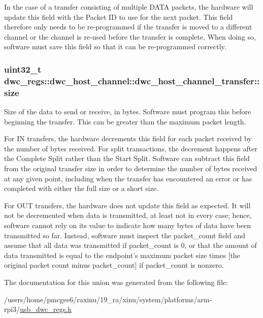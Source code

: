 In the case of a transfer consisting of multiple D\-A\-T\-A packets, the hardware will update this field with the Packet I\-D to use for the next packet. This field therefore only needs to be re-\/programmed if the transfer is moved to a different channel or the channel is re-\/used before the transfer is complete. When doing so, software must save this field so that it can be re-\/programmed correctly. \hypertarget{uniondwc__regs_1_1dwc__host__channel_1_1dwc__host__channel__transfer_a0e1440f67db061c82a011660549d373a}{
\subsubsection[{size}]{\setlength{\rightskip}{0pt plus 5cm}uint32\-\_\-t dwc\-\_\-regs\-::dwc\-\_\-host\-\_\-channel\-::dwc\-\_\-host\-\_\-channel\-\_\-transfer\-::size}}\label{uniondwc__regs_1_1dwc__host__channel_1_1dwc__host__channel__transfer_a0e1440f67db061c82a011660549d373a}
Size of the data to send or receive, in bytes. Software must program this before beginning the transfer. This can be greater than the maximum packet length.

For I\-N transfers, the hardware decrements this field for each packet received by the number of bytes received. For split transactions, the decrement happens after the Complete Split rather than the Start Split. Software can subtract this field from the original transfer size in order to determine the number of bytes received at any given point, including when the transfer has encountered an error or has completed with either the full size or a short size.

For O\-U\-T transfers, the hardware does not update this field as expected. It will not be decremented when data is transmitted, at least not in every case; hence, software cannot rely on its value to indicate how many bytes of data have been transmitted so far. Instead, software must inspect the packet\-\_\-count field and assume that all data was transmitted if packet\-\_\-count is 0, or that the amount of data transmitted is equal to the endpoint's maximum packet size times \mbox{[}the original packet count minus packet\-\_\-count\mbox{]} if packet\-\_\-count is nonzero. 

The documentation for this union was generated from the following file\-:\begin{DoxyCompactItemize}
\item 
/users/home/pmcgee6/raxinu/19\-\_\-ra/xinu/system/platforms/arm-\/rpi3/\hyperlink{usb__dwc__regs_8h}{usb\-\_\-dwc\-\_\-regs.\-h}\end{DoxyCompactItemize}
